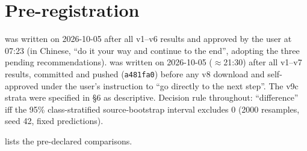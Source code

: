\section{Pre-registration}
 was written on 2026-10-05 after all v1--v6 results and approved by the user at 07:23
(in Chinese, ``do it your way and continue to the end'', adopting the three pending recommendations).  was written
on 2026-10-05 ($\approx$21:30) after all v1--v7 results, committed and pushed (\texttt{a481fa0}) before any v8 download and
self-approved under the user's instruction to ``go directly to the next step''. The v9c strata were specified in  \S6
as descriptive. Decision rule throughout: ``difference'' iff the 95\% class-stratified source-bootstrap interval excludes 0
(2000 resamples, seed 42, fixed predictions).

 lists the pre-declared comparisons.

